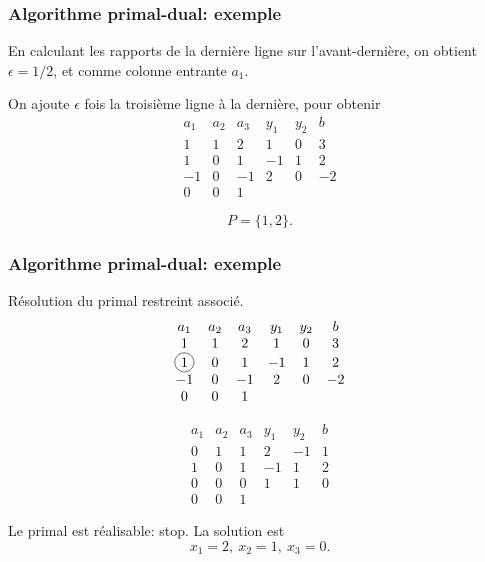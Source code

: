 \documentclass[t, aspectratio=169, usepdftitle=false]{beamer}
\newcommand*\circled[1]{\tikz[baseline=(char.base)]{
    \node[shape=circle,draw,inner sep=2pt] (char) {#1};}}
\begin{document}
\begin{frame}
\frametitle{Algorithme primal-dual: exemple}

En calculant les rapports de la dernière ligne sur l'avant-dernière, on obtient $\epsilon = 1/2$, et comme colonne entrante $a_1$.

\mbox{}

On ajoute $\epsilon$ fois la troisième ligne à la dernière, pour obtenir
\[
\begin{matrix}
a_1 & a_2 & a_3 & y_1 & y_2 & b \\
1 & 1 & 2 & 1 & 0 & 3 \\
1 & 0 & 1 & -1 & 1 & 2 \\
-1 & 0 & -1 & 2 & 0 & -2 \\
0 & 0 & 1
\end{matrix}
\]

\mbox{}

\[
P = \lbrace 1, 2 \rbrace.
\]

\end{frame}

\begin{frame}
\frametitle{Algorithme primal-dual: exemple}

Résolution du primal restreint associé.
\[
\begin{matrix}
a_1 & a_2 & a_3 & y_1 & y_2 & b \\
1 & 1 & 2 & 1 & 0 & 3 \\
\circled{1} & 0 & 1 & -1 & 1 & 2 \\
-1 & 0 & -1 & 2 & 0 & -2 \\
0 & 0 & 1
\end{matrix}
\]

\mbox{}

\[
\begin{matrix}
a_1 & a_2 & a_3 & y_1 & y_2 & b \\
0 & 1 & 1 & 2 & -1 & 1 \\
1 & 0 & 1 & -1 & 1 & 2 \\
0 & 0 & 0 & 1 & 1 & 0 \\
0 & 0 & 1
\end{matrix}
\]

Le primal est réalisable: stop. La solution est
\[
x_1 = 2,\ x_2 = 1,\ x_3 = 0.
\]

\end{frame}
\end{document}

